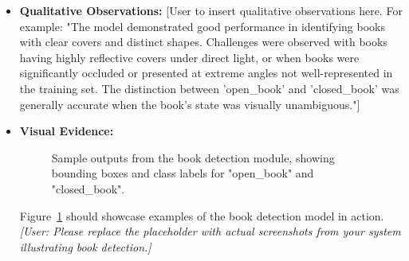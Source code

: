 \begin{itemize}
    \item \textbf{Qualitative Observations:} [User to insert qualitative observations here. For example: "The model demonstrated good performance in identifying books with clear covers and distinct shapes. Challenges were observed with books having highly reflective covers under direct light, or when books were significantly occluded or presented at extreme angles not well-represented in the training set. The distinction between 'open\_book' and 'closed\_book' was generally accurate when the book's state was visually unambiguous."]
    
    \item \textbf{Visual Evidence:}
    \begin{figure}[h!]
        \centering
        \framebox[0.8\textwidth][c]{\raisebox{0pt}[5cm][4cm]{Placeholder: Examples of Book Detection (Correct \& Incorrect if any)}}
        \caption{Sample outputs from the book detection module, showing bounding boxes and class labels for "open\_book" and "closed\_book".}
        \label{fig:book_detection_output}
    \end{figure}
    Figure~\ref{fig:book_detection_output} should showcase examples of the book detection model in action. \textit{[User: Please replace the placeholder with actual screenshots from your system illustrating book detection.]}
\end{itemize}

